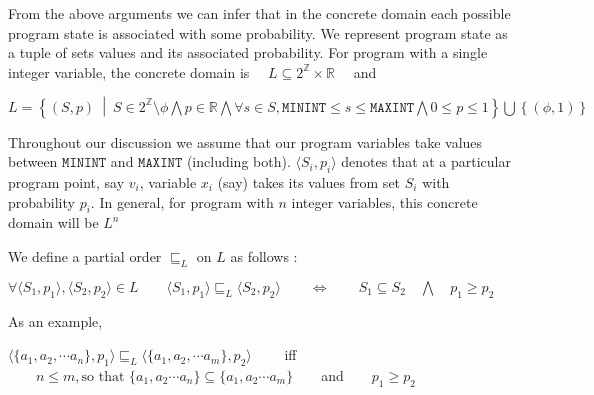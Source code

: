 \documentclass[final,3p, review, times]{util/elsarticle}
\begin{document}
From the above arguments we can infer that in the concrete domain each possible program state is associated with some probability. We represent program state as a tuple of sets values and its associated probability. For program with a single integer variable, the concrete domain is $\quad L\subseteq2^{\mathbb{Z}}\times\mathbb{R}\quad$ and

\centerline{
  $L=\left\{\left(S,p\right)\ \middle|\ S\in2^{\mathbb{Z}}\setminus\phi\bigwedge p\in\mathbb{R}\bigwedge \forall s\in S, \mathtt{MININT}\leq s\leq\mathtt{MAXINT}\bigwedge 0\leq p\leq1\right\}\bigcup\left\{\left(\phi,1\right)\right\}$
}

Throughout our discussion we assume that our program variables take values between $\mathbf{\mathtt{MININT}}$ and $\mathbf{\mathtt{MAXINT}}$ (including both). $\langle S_i,p_i\rangle$ denotes that at a particular program point, say $v_i$, variable $x_i$ (say) takes its values from set $S_i$ with probability $p_i$. In general, for program with $n$ integer variables, this concrete domain will be $L^n$

We define a partial order $\sqsubseteq_L$ on $L$ as follows :

\centerline{$\forall \langle S_1,p_1\rangle, \langle S_2,p_2\rangle\in L\qquad \langle S_1,p_1\rangle\sqsubseteq_L \langle S_2,p_2\rangle\qquad\iff \qquad S_1\subseteq S_2\quad\bigwedge\quad p_1\geq p_2$}

As an example,\\
\centerline{
  $\langle\{a_1, a_2,\cdots a_n\},p_1\rangle\sqsubseteq_L\langle\{a_1, a_2,\cdots a_m\},p_2\rangle\qquad$ iff $\qquad n\leq m, \text{so that\ }\{a_1,a_2\cdots a_n\}\subseteq\{a_1,a_2\cdots a_m\}\qquad$and$\qquad p_1\geq p_2$
}
\end{document}
